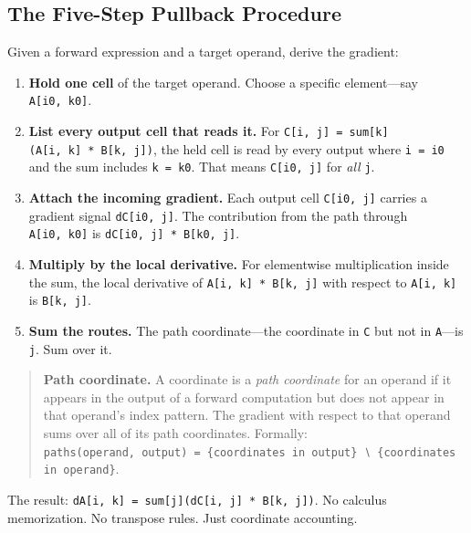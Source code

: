 \documentclass[11pt,titlepage]{article}
\providecommand{\tightlist}{%
  \setlength{\itemsep}{0pt}\setlength{\parskip}{0pt}}
\begin{document}
\vspace{2em}

\hypertarget{the-five-step-pullback-procedure}{%
\subsection{The Five-Step Pullback
Procedure}\label{the-five-step-pullback-procedure}}

Given a forward expression and a target operand, derive the gradient:

\begin{enumerate}
\def\labelenumi{\arabic{enumi}.}
\tightlist
\item
  \textbf{Hold one cell} of the target operand. Choose a specific
  element---say \texttt{A{[}i0,\ k0{]}}.
\item
  \textbf{List every output cell that reads it.} For
  \texttt{C{[}i,\ j{]}\ =\ sum{[}k{]}(A{[}i,\ k{]}\ *\ B{[}k,\ j{]})},
  the held cell is read by every output where \texttt{i\ =\ i0} and the
  sum includes \texttt{k\ =\ k0}. That means \texttt{C{[}i0,\ j{]}} for
  \emph{all} \texttt{j}.
\item
  \textbf{Attach the incoming gradient.} Each output cell
  \texttt{C{[}i0,\ j{]}} carries a gradient signal
  \texttt{dC{[}i0,\ j{]}}. The contribution from the path through
  \texttt{A{[}i0,\ k0{]}} is \texttt{dC{[}i0,\ j{]}\ *\ B{[}k0,\ j{]}}.
\item
  \textbf{Multiply by the local derivative.} For elementwise
  multiplication inside the sum, the local derivative of
  \texttt{A{[}i,\ k{]}\ *\ B{[}k,\ j{]}} with respect to
  \texttt{A{[}i,\ k{]}} is \texttt{B{[}k,\ j{]}}.
\item
  \textbf{Sum the routes.} The path coordinate---the coordinate in
  \texttt{C} but not in \texttt{A}---is \texttt{j}. Sum over it.
\end{enumerate}

\begin{quote}
\textbf{Path coordinate.} A coordinate is a \emph{path coordinate} for
an operand if it appears in the output of a forward computation but does
not appear in that operand's index pattern. The gradient with respect to
that operand sums over all of its path coordinates. Formally:
\texttt{paths(operand,\ output)\ =\ \{coordinates\ in\ output\}\ ∖\ \{coordinates\ in\ operand\}}.
\end{quote}

The result:
\texttt{dA{[}i,\ k{]}\ =\ sum{[}j{]}(dC{[}i,\ j{]}\ *\ B{[}k,\ j{]})}.
No calculus memorization. No transpose rules. Just coordinate
accounting.
\end{document}
